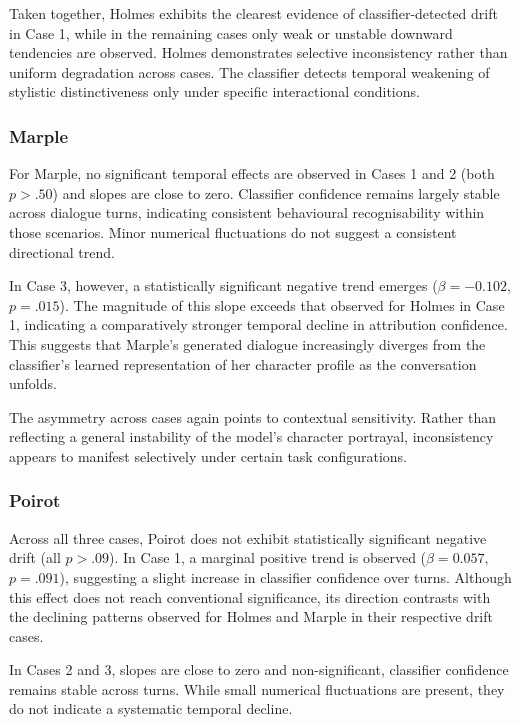 \documentclass{article}
\begin{document}
Taken together, Holmes exhibits the clearest evidence of classifier-detected drift in Case 1, while in the remaining cases only weak or unstable downward tendencies are observed. Holmes demonstrates selective inconsistency rather than uniform degradation across cases. The classifier detects temporal weakening of stylistic distinctiveness only under specific interactional conditions.

\subsubsection{Marple}

For Marple, no significant temporal effects are observed in Cases 1 and 2 (both $p>.50$) and slopes are close to zero. Classifier confidence remains largely stable across dialogue turns, indicating consistent behavioural recognisability within those scenarios. Minor numerical fluctuations do not suggest a consistent directional trend.

In Case 3, however, a statistically significant negative trend emerges ($\beta=-0.102$, $p=.015$). The magnitude of this slope exceeds that observed for Holmes in Case 1, indicating a comparatively stronger temporal decline in attribution confidence. This suggests that Marple’s generated dialogue increasingly diverges from the classifier’s learned representation of her character profile as the conversation unfolds.

The asymmetry across cases again points to contextual sensitivity. Rather than reflecting a general instability of the model’s character portrayal, inconsistency appears to manifest selectively under certain task configurations.

\subsubsection{Poirot}

Across all three cases, Poirot does not exhibit statistically significant negative drift (all $p>.09$). In Case 1, a marginal positive trend is observed ($\beta=0.057$, $p=.091$), suggesting a slight increase in classifier confidence over turns. Although this effect does not reach conventional significance, its direction contrasts with the declining patterns observed for Holmes and Marple in their respective drift cases.

In Cases 2 and 3, slopes are close to zero and non-significant, classifier confidence remains stable across turns. While small numerical fluctuations are present, they do not indicate a systematic temporal decline.
\end{document}
